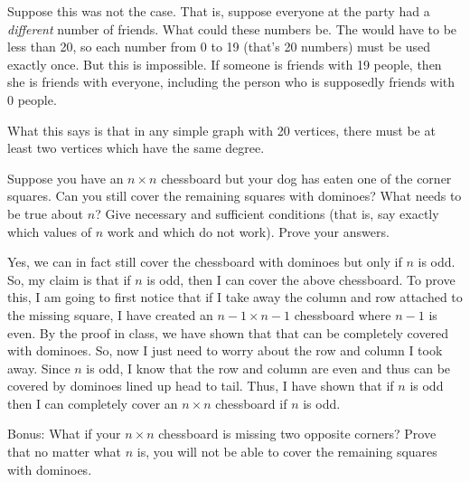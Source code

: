 \documentclass[11pt]{exam}
\begin{document}
\begin{questions}
\begin{solution}
  Suppose this was not the case.  That is, suppose everyone at the party had a {\em different} number of friends.  What could these numbers be.  The would have to be less than 20, so each number from 0 to 19 (that's 20 numbers) must be used exactly once.  But this is impossible. If someone is friends with 19 people, then she is friends with everyone, including the person who is supposedly friends with 0 people.
  
  What this says is that in any simple graph with 20 vertices, there must be at least two vertices which have the same degree.
\end{solution}


\question[6] Suppose you have an $n\times n$ chessboard but your dog has eaten one of the corner squares. Can you still cover the remaining squares with dominoes? What needs to be true about $n$? Give necessary and sufficient conditions (that is, say exactly which values of $n$ work and which do not work). Prove your answers.

\begin{center}
\end{center}
\begin{solution}
Yes, we can in fact still cover the chessboard with dominoes but only if $n$ is odd. So, my claim is that if $n$ is odd, then I can cover the above chessboard. 
To prove this, I am going to first notice that if I take away the column and row attached to the missing square, I have created an $n-1\times n-1$ chessboard where $n-1$ is even. By the proof in class, we have shown that that can be completely covered with dominoes. So, now I just need to worry about the row and column I took away. Since $n$ is odd, I know that the row and column are even and thus can be covered by dominoes lined up head to tail. Thus, I have shown that if $n$ is odd then I can completely cover an $n\times n$ chessboard if $n$ is odd.
\end{solution}
\bonusquestion[4] Bonus: What if your $n\times n$ chessboard is missing two opposite corners?  Prove that no matter what $n$ is, you will not be able to cover the remaining squares with dominoes. 


\end{questions}
\end{document}
